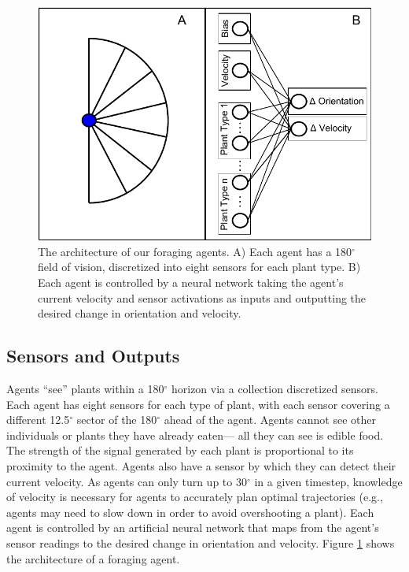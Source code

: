 \documentclass{sig-alternate}
\begin{document}
\begin{figure}[t]
  \centering
    \includegraphics[scale=.665]{foraging_agent_architecture.pdf}  \caption{The architecture of our foraging agents. A) Each agent has a 180$^{\circ}$ field of vision, discretized into eight sensors for each plant type. B) Each agent is controlled by a neural network taking the agent's current velocity and sensor activations as inputs and outputting the desired change in orientation and velocity.}
  \label{fig:agent-architecture}
\end{figure}

\subsection*{Sensors and Outputs}

Agents ``see'' plants within a 180$^\circ$ horizon via a collection discretized sensors. Each agent has eight sensors for each type of plant, with each sensor covering a different 12.5$^\circ$ sector of the 180$^\circ$ ahead of the agent. Agents cannot see other individuals or plants they have already eaten--- all they can see is edible food. The strength of the signal generated by each plant is proportional to its proximity to the agent. Agents also have a sensor by which they can detect their current velocity. As agents can only turn up to 30$^\circ$ in a given timestep, knowledge of velocity is necessary for agents to accurately plan optimal trajectories (e.g., agents may need to slow down in order to avoid overshooting a plant).  Each agent is controlled by an artificial neural network that maps from the agent's sensor readings to the desired change in orientation and velocity. Figure \ref{fig:agent-architecture} shows the architecture of a foraging agent.
\end{document}
